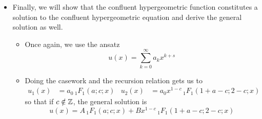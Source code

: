 \documentclass[../finalProject.tex]{subfiles}
\begin{document}
\begin{itemize}
\begin{itemize}
    \end{itemize}
    \item Finally, we will show that the confluent hypergeometric function constitutes a solution to the confluent hypergeometric equation and derive the general solution as well.
    \begin{itemize}
        \item Once again, we use the ansatz
        \begin{equation*}
            u(x) = \sum_{k=0}^\infty a_kx^{k+s}
        \end{equation*}
        \item Doing the casework and the recursion relation gets us to
        \begin{align*}
            u_1(x) &= a_0\,{}_1F_1(a;c;x)&
            u_2(x) &= a_0x^{1-c}\,{}_1F_1(1+a-c;2-c;x)
        \end{align*}
        so that if $c\notin\mathbb{Z}$, the general solution is
        \begin{equation*}
            u(x) = A\,{}_1F_1(a;c;x)+Bx^{1-c}\,{}_1F_1(1+a-c;2-c;x)
        \end{equation*}
    \end{itemize}
\end{itemize}
\end{document}
